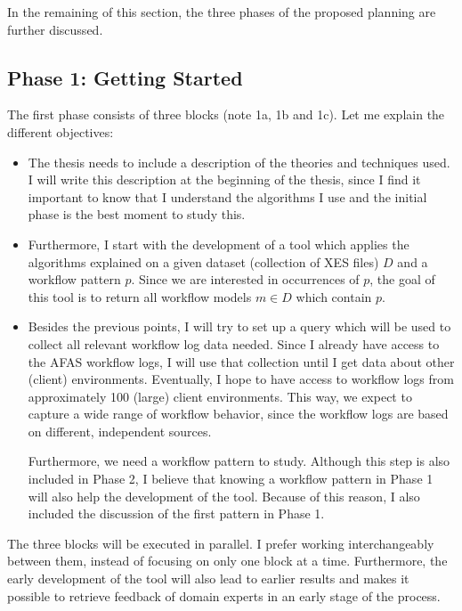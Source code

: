 \documentclass[a4paper,11pt]{article}
\begin{document}
In the remaining of this section, the three phases of the proposed planning are further discussed.

\subsection{Phase 1: Getting Started}
The first phase consists of three blocks (note 1a, 1b and 1c). Let me explain the different objectives:
\begin{itemize}
\item The thesis needs to include a description of the theories and techniques used. I will write this description at the beginning of the thesis, since I find it important to know that I understand the algorithms I use and the initial phase is the best moment to study this.
\item Furthermore, I start with the development of a tool which applies the algorithms explained on a given dataset (collection of XES files) $D$ and a workflow pattern $p$. Since we are interested in occurrences of $p$, the goal of this tool is to return all workflow models $m \in D$ which contain $p$.
\item Besides the previous points, I will try to set up a query which will be used to collect all relevant workflow log data needed. Since I already have access to the AFAS workflow logs, I will use that collection until I get data about other (client) environments. Eventually, I hope to have access to workflow logs from approximately 100 (large) client environments. This way, we expect to capture a wide range of workflow behavior, since the workflow logs are based on different, independent sources.

Furthermore, we need a workflow pattern to study. Although this step is also included in Phase 2, I believe that knowing a workflow pattern in Phase 1 will also help the development of the tool. Because of this reason, I also included the discussion of the first pattern in Phase 1.
\end{itemize}

The three blocks will be executed in parallel. I prefer working interchangeably between them, instead of focusing on only one block at a time. Furthermore, the early development of the tool will also lead to earlier results and makes it possible to retrieve feedback of domain experts in an early stage of the process.
\end{document}
